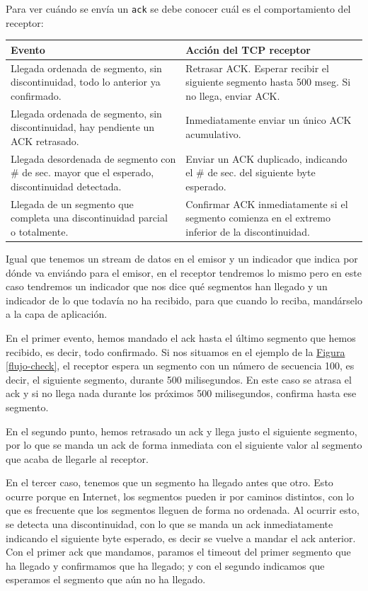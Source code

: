\documentclass[10pt,a4paper,spanish]{report}
\begin{document}
Para ver cuándo se envía un \texttt{ack} se debe conocer cuál es el comportamiento del receptor:


\begin{center}
{
\begin{tabular}{|p{6cm}|p{6cm}|}
\hline
\textbf{\textcolor{tema3}{Evento}} & \textbf{\textcolor{tema3}{Acción del TCP receptor}} \\
\hline
Llegada ordenada de segmento, sin discontinuidad, todo lo anterior ya confirmado. & Retrasar ACK. Esperar recibir el siguiente segmento hasta 500 mseg. Si no llega, enviar ACK.\\
\hline
Llegada ordenada de segmento, sin discontinuidad, hay pendiente un ACK retrasado. & Inmediatamente enviar un único ACK acumulativo.\\
\hline
Llegada desordenada de segmento con \# de sec. mayor que el esperado, discontinuidad detectada. & Enviar un ACK duplicado, indicando el \# de sec. del siguiente byte esperado.\\
\hline
Llegada de un segmento que completa una discontinuidad parcial o totalmente. & Confirmar ACK inmediatamente si el segmento comienza en el extremo inferior de la discontinuidad.\\
\hline
\end{tabular}
}
\end{center}

Igual que tenemos un stream de datos en el emisor y un indicador que indica por dónde va enviándo para el emisor, en el receptor tendremos lo mismo pero en este caso tendremos un indicador que nos dice qué segmentos han llegado y un indicador de lo que todavía no ha recibido, para que cuando lo reciba, mandárselo a la capa de aplicación. 

En el primer evento, hemos mandado el ack hasta el último segmento que hemos recibido, es decir, todo confirmado. Si nos situamos en el ejemplo de la \hyperref[flujo-check]{Figura \ref*{flujo-check}}, el receptor espera un segmento con un número de secuencia 100, es decir, el siguiente segmento, durante 500 milisegundos. En este caso se atrasa el ack y si no llega nada durante los próximos 500 milisegundos, confirma hasta ese segmento. 

En el segundo punto, hemos retrasado un ack y llega justo el siguiente segmento, por lo que se manda un ack de forma inmediata con el siguiente valor al segmento que acaba de llegarle al receptor.

En el tercer caso, tenemos que un segmento ha llegado antes que otro. Esto ocurre porque en Internet, los segmentos pueden ir por caminos distintos, con lo que es frecuente que los segmentos lleguen de forma no ordenada. Al ocurrir esto, se detecta una discontinuidad, con lo que se manda un ack inmediatamente indicando el siguiente byte esperado, es decir se vuelve a mandar el ack anterior. Con el primer ack que mandamos, paramos el timeout del primer segmento que ha llegado y confirmamos que ha llegado; y con el segundo indicamos que esperamos el segmento que aún no ha llegado.
\end{document}
